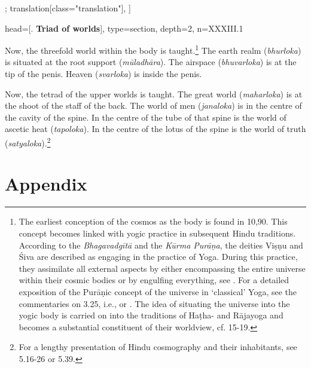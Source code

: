 \begin{alignment}[
  texts=edition[class="edition"];
  translation[class="translation"],
  ]
\begin{translation}
{          head={[. \textbf{Triad of worlds}]},
          type=section,
          depth=2, 
          n=XXXIII.1
        }
\begin{tlate}[p33_01]
  \noindent
Now, the threefold world within the body is taught.\footnote{The earliest conception of the cosmos as the body is found in  10,90. This concept becomes linked with yogic practice in subsequent Hindu traditions. According to the \textit{Bhagavadgītā} and the \textit{Kūrma Purāṇa}, the deities Viṣṇu and Śiva are described as engaging in the practice of Yoga. During this practice, they assimilate all external aspects by either encompassing the entire universe within their cosmic bodies or by engulfing everything, see \citeauthor[2011:88]{white2011}. For a detailed exposition of the Purāṇic concept of the universe in `classical' Yoga, see the commentaries on  3.25, i.e., \citeauthor[1983: 297-304]{aranya} or \citeauthor[2009:353-356]{bryant2009}. The idea of situating the universe into the yogic body is carried on into the traditions of Haṭha- and Rājayoga and becomes a substantial constituent of their worldview, cf.  15-19.} The earth realm (\textit{bhurloka}) is situated at the root support (\textit{mūladhāra}). The airspace (\textit{bhuvarloka}) is at the tip of the penis. Heaven (\textit{svarloka}) is inside the penis.
\end{tlate}
\begin{tlate}[p34_01]
Now, the tetrad of the upper worlds is taught. The great world (\textit{maharloka}) is at the shoot of the staff of the back. The world of men (\textit{janaloka}) is in the centre of the cavity of the spine. In the centre of the tube of that spine is the world of ascetic heat (\textit{tapoloka}). In the centre of the lotus of the spine is the world of truth (\textit{satyaloka}).\footnote{For a lengthy presentation of Hindu cosmography and their inhabitants, see  5.16-26 or  5.39.}
\flushpage 
\end{tlate}
  \end{translation}
\end{alignment}
\pagebreak %
\cleardoublepage
{}
\chapter{Appendix}
